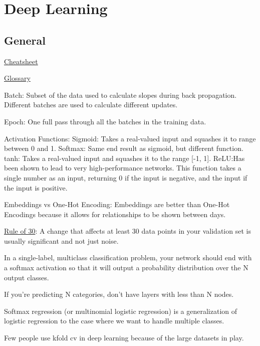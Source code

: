 \documentclass[]{book}
\begin{document}
\hypertarget{deep-learning}{%
\chapter{Deep Learning}\label{deep-learning}}

\hypertarget{general-6}{%
\section{General}\label{general-6}}

\href{https://stanford.edu/~shervine/teaching/cs-229/cheatsheet-deep-learning}{Cheatsheet}

\href{http://www.wildml.com/deep-learning-glossary/}{Glossary}

Batch: Subset of the data used to calculate slopes during back propagation. Different batches are used to calculate different updates.

Epoch: One full pass through all the batches in the training data.

Activation Functions: Sigmoid: Takes a real-valued input and squashes it to range between 0 and 1. Softmax: Same end result as sigmoid, but different function. tanh: Takes a real-valued input and squashes it to the range {[}-1, 1{]}. ReLU:Has been shown to lead to very high-performance networks. This function takes a single number as an input, returning 0 if the input is negative, and the input if the input is positive.

Embeddings vs One-Hot Encoding: Embeddings are better than One-Hot Encodings because it allows for relationships to be shown between days.

\href{https://www.youtube.com/watch?v=nqEYVzJLR_c\&feature=youtu.be\&t=31}{Rule of 30}: A change that affects at least 30 data points in your validation set is usually significant and not just noise.

In a single-label, multiclass classification problem, your network should end with a softmax activation so that it will output a probability distribution over the N output classes.

If you're predicting N categories, don't have layers with less than N nodes.

Softmax regression (or multinomial logistic regression) is a generalization of logistic regression to the case where we want to handle multiple classes.

Few people use kfold cv in deep learning because of the large datasets in play.
\end{document}
